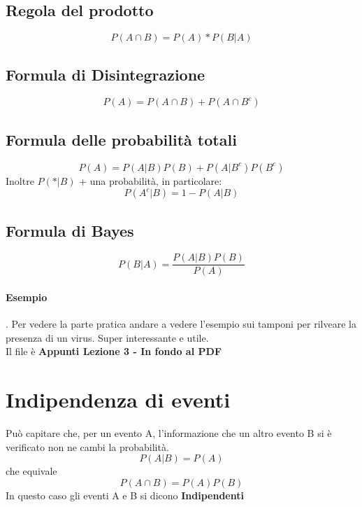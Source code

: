 \subsection{Regola del prodotto}
\begin{equation}
    P(A \cap B) = P(A)*P(B|A)
\end{equation}
\subsection{Formula di Disintegrazione}
\begin{equation}
    P(A) = P(A \cap B) + P(A \cap B^c)
\end{equation}
\subsection{Formula delle probabilità totali}
\begin{equation}
    P(A) = P(A|B)P(B) + P(A|B^c)P(B^c)
\end{equation}
Inoltre $P(*|B)$ + una probabilità, in particolare:
\begin{equation}
    P(A^c|B) = 1 - P(A|B)
\end{equation}
\subsection{Formula di Bayes}
\begin{equation}
    P(B|A) = \frac{P(A|B)P(B)}{P(A)}
\end{equation}
\paragraph{Esempio}. Per vedere la parte pratica andare a vedere l'esempio sui tamponi
per rilveare la presenza di un virus. Super interessante e utile.
\\Il file è \textbf{Appunti Lezione 3 - In fondo al PDF}

\section{Indipendenza di eventi}
Può capitare che, per un evento A, l'informazione che un altro evento B si è verificato
non ne cambi la probabilità.
\begin{equation}
    P(A|B) = P(A)
\end{equation}
che equivale
\begin{equation}
    P(A \cap B) = P(A)P(B)
\end{equation}
In questo caso gli eventi A e B si dicono \textbf{Indipendenti}
